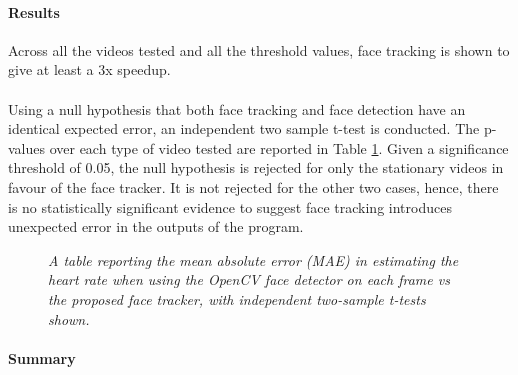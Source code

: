 \paragraph{Results}
Across all the videos tested and all the threshold values, face tracking is shown to give at least a 3x speedup.
\\\\
Using a null hypothesis that both face tracking and face detection have an identical expected error, an independent two sample t-test is conducted. The p-values over each type of video tested are reported in Table \ref{table:mae_facedet}.
Given a significance threshold of 0.05, the null hypothesis is rejected for only the stationary videos in favour of the face tracker.
It is not rejected for the other two cases, hence, there is no statistically significant evidence to suggest face tracking introduces unexpected error in the outputs of the program.
%     
\begin{figure}[H]
    \centering
    \caption{\textit{A table reporting the mean absolute error (MAE) in estimating the heart rate when using the OpenCV face detector on each frame vs the proposed face tracker, with independent two-sample t-tests shown. }}
    \label{table:mae_facedet}
    \end{figure}



\paragraph{Summary}

